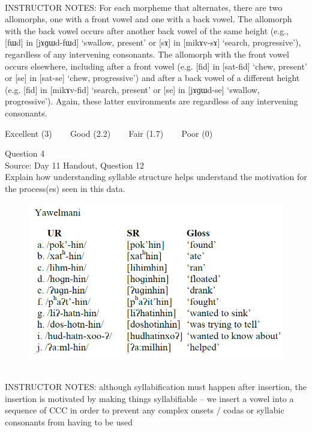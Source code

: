 \documentclass[12pt]{article}
\begin{document}
~\\
INSTRUCTOR NOTES: For each morpheme that alternates, there are two allomorphs, one with a front vowel and one with a back vowel. The allomorph with the back vowel occurs after another back vowel of the same height (e.g., [fɯd] in [jɤɡɯd-fɯd] ‘swallow, present’ or [sɤ] in [mikɤv-sɤ] ‘search, progressive’), regardless of any intervening consonants. The allomorph with the front vowel occurs elsewhere, including after a front vowel (e.g. [fid] in [sat-fid] ‘chew, present’ or [se] in [sat-se] ‘chew, progressive’) and after a back vowel of a different height (e.g. [fid] in [mikɤv-fid] ‘search, present’ or [se] in [jɤɡɯd-se] ‘swallow, progressive’). Again, these latter environments are regardless of any intervening consonants.


\vfill
Excellent (3) ~~~ Good (2.2) ~~~ Fair (1.7) ~~~ Poor (0)
\newpage

{\large Question 4}\\

Source: Day 11 Handout, Question 12\\

Explain how understanding syllable structure helps understand the motivation for the process(es) seen in this data.\\

\begin{figure}[H]
\includegraphics{../images/yawelmani.png}
\end{figure}

~\\
INSTRUCTOR NOTES: although syllabification must happen after insertion, the insertion is motivated by making things syllabifiable -- we insert a vowel into a sequence of CCC in order to prevent any complex onsets / codas or syllabic consonants from having to be used
\end{document}

